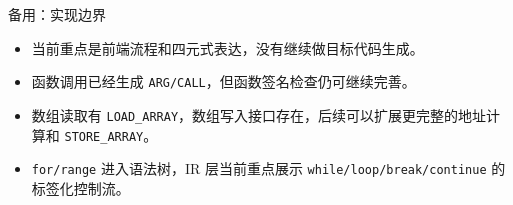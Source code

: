 \documentclass[aspectratio=169]{ctexbeamer}
\begin{document}
\begin{frame}{备用：实现边界}
    \begin{itemize}
        \item 当前重点是前端流程和四元式表达，没有继续做目标代码生成。
        \item 函数调用已经生成 \texttt{ARG/CALL}，但函数签名检查仍可继续完善。
        \item 数组读取有 \texttt{LOAD\_ARRAY}，数组写入接口存在，后续可以扩展更完整的地址计算和 \texttt{STORE\_ARRAY}。
        \item \texttt{for/range} 进入语法树，IR 层当前重点展示 \texttt{while/loop/break/continue} 的标签化控制流。
    \end{itemize}
\end{frame}
\end{document}

